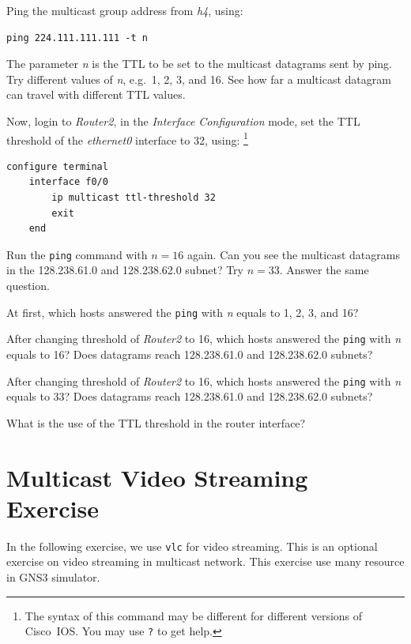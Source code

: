 \documentclass{../UTNetLab}
\begin{document}
    Ping the multicast group address from \textit{h4}, using: 

    \begin{lstlisting}[emph={n}]
ping 224.111.111.111 -t n
    \end{lstlisting}

    The parameter \textit{n} is the TTL to be set to the multicast datagrams sent by ping.
    Try different values of \textit{n}, e.g.\ 1, 2, 3, and 16.
    See how far a multicast datagram can travel with different TTL values.

    Now, login to \textit{Router2}, in the \textit{Interface Configuration} mode, set the TTL threshold of the \textit{ethernet0} interface to 32, using: 
    \footnote{The syntax of this command may be different for different versions of Cisco~IOS.
    You may use \lstinline[language={cisco}]{?} to get help.}

    \begin{lstlisting}[language={cisco}]    
configure terminal
    interface f0/0
        ip multicast ttl-threshold 32
        exit
    end
    \end{lstlisting}

    Run the \lstinline{ping} command with $n = 16$ again.
    Can you see the multicast datagrams in the 128.238.61.0 and 128.238.62.0 subnet?
    Try $n = 33$.
    Answer the same question.
    
    \begin{report}
    \item At first, which hosts answered the \lstinline{ping} with \textit{n} equals to 1, 2, 3, and 16?
    \item After changing threshold of \textit{Router2} to 16, which hosts answered the \lstinline{ping} with \textit{n} equals to 16?
    Does datagrams reach 128.238.61.0 and 128.238.62.0 subnets?
    \item After changing threshold of \textit{Router2} to 16, which hosts answered the \lstinline{ping} with \textit{n} equals to 33?
    Does datagrams reach 128.238.61.0 and 128.238.62.0 subnets?
    
    \item What is the use of the TTL threshold in the router interface?
    \end{report}

\part{Multicast Video Streaming Exercise\label{sec:multicast-streaming}}
    In the following exercise, we use \lstinline{vlc} for video streaming.
    This is an optional exercise on video streaming in multicast network.
    This exercise use many resource in GNS3 simulator.
    
\end{document}

